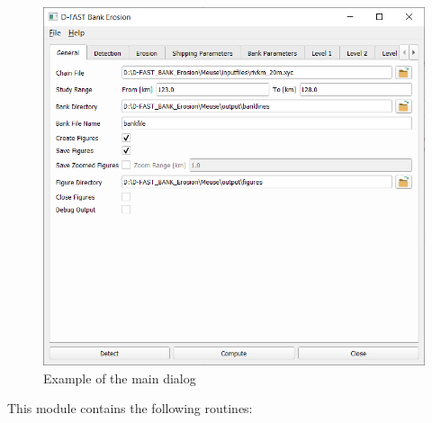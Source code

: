 \begin{figure}
\center
\includegraphics[width=\textwidth]{figures/gui1.png}
\caption{Example of the main dialog}
\end{figure}

This module contains the following routines:

